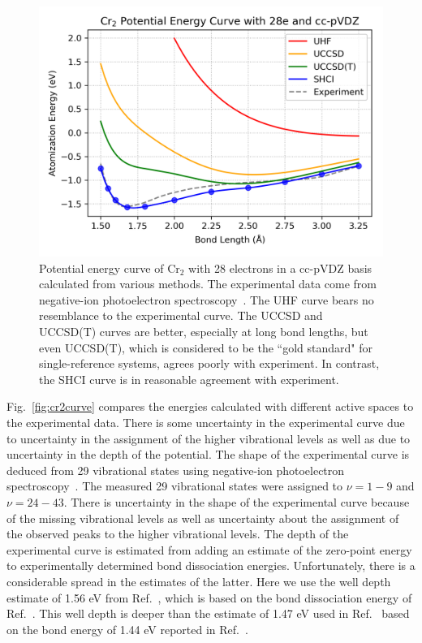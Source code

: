 \begin{figure}
  \begin{center}
  \includegraphics[width=0.9\linewidth]{figs/hfcc.png}
  \caption{Potential energy curve of Cr$_2$ with 28 electrons in a cc-pVDZ basis calculated from various methods.
  The experimental data come from negative-ion photoelectron spectroscopy~\cite{casey1993negative}.
  The UHF curve bears no resemblance to the experimental curve.
  The UCCSD and UCCSD(T) curves are better, especially at long bond lengths, but even UCCSD(T), which is considered to be the ``gold standard" for single-reference
  systems, agrees poorly with experiment.  In contrast, the SHCI curve is in reasonable agreement with experiment.
}
  \label{fig:hfcc}
  \end{center}
\end{figure}

Fig.~\ref{fig:cr2curve} compares the energies calculated with different active spaces to the experimental data.
There is some uncertainty in the experimental curve due to uncertainty in the assignment of the higher vibrational levels
as well as due to uncertainty in the depth of the potential.
The shape of the experimental curve is deduced from 29 vibrational states using negative-ion photoelectron spectroscopy~\cite{casey1993negative}.
The measured 29 vibrational states were assigned to $\nu=1-9$ and $\nu=24-43$.
There is uncertainty in the shape of the experimental curve because of the missing vibrational levels as well as uncertainty
about the assignment of the observed peaks to the higher vibrational levels.
The depth of the experimental curve is estimated from adding an estimate of the zero-point energy
to experimentally determined bond dissociation energies.
Unfortunately, there is a considerable spread in the estimates of the latter.
Here we use the well depth estimate of 1.56 eV from Ref.~\cite{VanMalVer-JCTC-16}, which is based on the bond dissociation
energy of Ref.~\cite{simard1998photoionization}.
This well depth is deeper than the estimate of 1.47 eV used in Ref.~\cite{GuoWatHuSunCha-JCTC-16} based on
the bond energy of 1.44 eV reported in Ref.~\cite{casey1993negative}.

